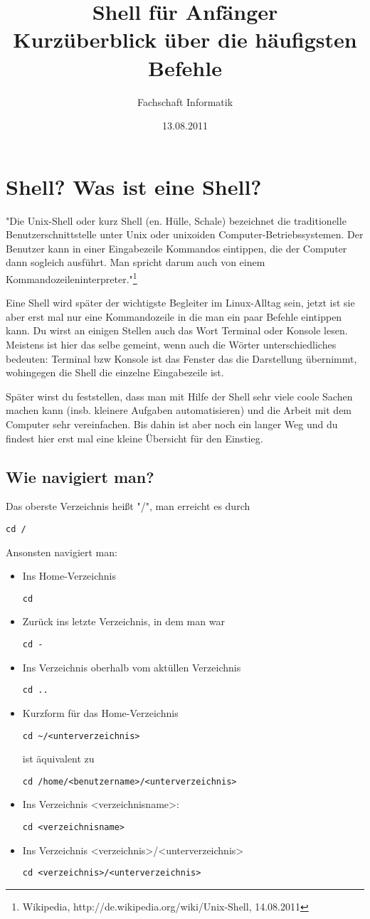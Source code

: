 \documentclass[a4paper,10pt]{article}
\title{Shell für Anfänger\\
\large{Kurzüberblick über die häufigsten Befehle}}
\author{Fachschaft Informatik}
\date{13.08.2011}
\newcommand{\befehl}[1]{
  \begin{center}
    \texttt{#1}
  \end{center}
}
\begin{document}
  \maketitle

  \tableofcontents
  \parindent 0pt
  \parskip 10pt
  \section{Shell? Was ist eine Shell?}
    "Die Unix-Shell oder kurz Shell (en. Hülle, Schale) bezeichnet die traditionelle Benutzerschnittstelle unter Unix oder unixoiden Computer-Betriebssystemen. Der Benutzer kann in einer Eingabezeile Kommandos eintippen, die der Computer dann sogleich ausführt. Man spricht darum auch von einem Kommandozeileninterpreter."\footnote{Wikipedia, http://de.wikipedia.org/wiki/Unix-Shell, 14.08.2011}

Eine Shell wird später der wichtigste Begleiter im Linux-Alltag sein, jetzt ist sie aber erst mal nur eine Kommandozeile in die man ein paar Befehle eintippen kann. Du wirst an einigen Stellen auch das Wort Terminal oder Konsole lesen. Meistens ist hier das selbe gemeint, wenn auch die Wörter unterschiedliches bedeuten: Terminal bzw Konsole ist das Fenster das die Darstellung übernimmt, wohingegen die Shell die einzelne Eingabezeile ist.

Später wirst du feststellen, dass man mit Hilfe der Shell sehr viele coole Sachen machen kann (insb. kleinere Aufgaben automatisieren) und die Arbeit mit dem Computer sehr vereinfachen. Bis dahin ist aber noch ein langer Weg und du findest hier erst mal eine kleine Übersicht für den Einstieg.
    \subsection{Wie navigiert man?}
      Das oberste Verzeichnis heißt "/", man erreicht es durch 
      \befehl{cd /}
      Ansonsten navigiert man:
      \begin{itemize}
	\item Ins Home-Verzeichnis 
	  \befehl{cd}
	\item Zurück ins letzte Verzeichnis, in dem man war 
	  \befehl{cd -}
	\item Ins Verzeichnis oberhalb vom aktüllen Verzeichnis 
	  \befehl{cd ..} 
	\item  Kurzform für das Home-Verzeichnis 
	  \befehl{cd \textasciitilde/<unterverzeichnis>} 
	  ist äquivalent zu 
	  \befehl{cd /home/<benutzername>/<unterverzeichnis>}
	\item Ins Verzeichnis <verzeichnisname>: 
	  \befehl{cd <verzeichnisname>}
	\item Ins Verzeichnis <verzeichnis>/<unterverzeichnis> 
	  \befehl{cd <verzeichnis>/<unterverzeichnis>}
      \end{itemize}
\end{document}
